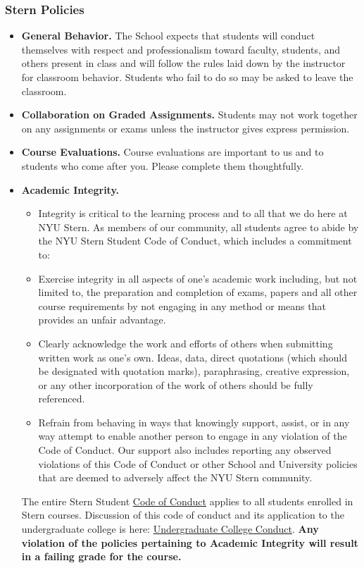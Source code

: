 \documentclass[12pt,pdftex,twoside,letterpaper]{exam}
\begin{document}
\subsubsection*{Stern Policies}
\begin{itemize}
\item \textbf{General Behavior.} The School expects that students will conduct themselves with respect and professionalism toward faculty, students, and others present in class and will follow the rules laid down by the instructor for classroom behavior.  Students who fail to do so may be asked to leave the classroom.

\item \textbf{Collaboration on Graded Assignments.} Students may not work together on any assignments or exams unless the instructor gives express permission.

\item \textbf{Course Evaluations.} Course evaluations are important to us and to students who come after you.  Please complete them thoughtfully.

\item \textbf{Academic Integrity.}
\begin{itemize}
\item Integrity is critical to the learning process and to all that we do here at NYU Stern. As members of our community, all students agree to abide by the NYU Stern Student Code of Conduct, which includes a commitment to:
\item Exercise integrity in all aspects of one's academic work including, but not limited to, the preparation and completion of exams, papers and all other course requirements by not engaging in any method or means that provides an unfair advantage.
\item Clearly acknowledge the work and efforts of others when submitting written work as one's own. Ideas, data, direct quotations (which should be designated with quotation marks), paraphrasing, creative expression, or any other incorporation of the work of others should be fully referenced.
\item Refrain from behaving in ways that knowingly support, assist, or in any way attempt to enable another person to engage in any violation of the Code of Conduct. Our support also includes reporting any observed violations of this Code of Conduct or other School and University policies that are deemed to adversely affect the NYU Stern community.
\end{itemize}
The entire Stern Student \href{http://www.stern.nyu.edu/sites/default/files/assets/documents/con_039512.pdf}{Code of Conduct} applies to all students enrolled in Stern courses. Discussion of this code of conduct and its application to the undergraduate college is here: \href{http://www.stern.nyu.edu/uc/codeofconduct}{Undergraduate College Conduct}. \textbf{Any violation of the policies pertaining to Academic Integrity will result in a failing grade for the course.}
\end{itemize}
\end{document}
